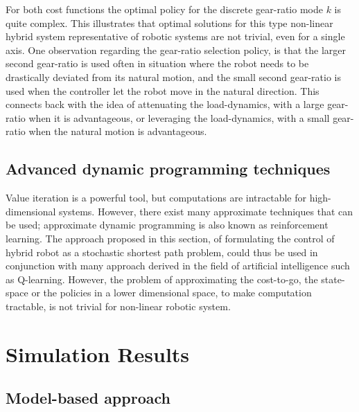 For both cost functions the optimal policy for the discrete gear-ratio mode $k$ is quite complex. This illustrates that optimal solutions for this type non-linear hybrid system representative of robotic systems are not trivial, even for a single axis. One observation regarding the gear-ratio selection policy, is that the larger second gear-ratio is used often in situation where the robot needs to be drastically deviated from its natural motion, and the small second gear-ratio is used when the controller let the robot move in the natural direction. This connects back with the idea of attenuating the load-dynamics, with a large gear-ratio when it is advantageous, or leveraging the load-dynamics, with a small gear-ratio when the natural motion is advantageous. 



\subsection{Advanced dynamic programming techniques}

Value iteration is a powerful tool, but computations are intractable for high-dimensional systems. However, there exist many approximate techniques that can be used; approximate dynamic programming is also known as reinforcement learning. The approach proposed in this section, of formulating the control of hybrid robot as a stochastic shortest path problem, could thus be used in conjunction with many approach derived in the field of artificial intelligence such as Q-learning. However, the problem of approximating the cost-to-go, the state-space or the policies in a lower dimensional space, to make computation tractable, is not trivial for non-linear robotic system.


\newpage
\section{Simulation Results}
\label{sec:shift_sim}


\subsection{Model-based approach}


